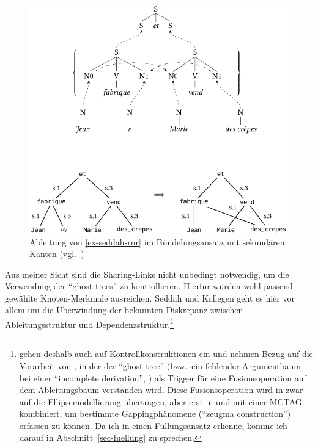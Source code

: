 \begin{figure}[t]
\centering
\includegraphics{graphics/abb813.pdf}
\caption{\label{fig-seddah-rnr-2}Ableitung von \ref{ex-seddah-rnr} im Bündelungsansatz mit sekundären Kanten (vgl.\ \citealt[Abbildung~2]{Seddah:etal:10})}
\end{figure}
   
\largerpage
Aus meiner Sicht sind die Sharing-Links nicht unbedingt notwendig, um die Verwendung der "`ghost trees"' zu kontrollieren. Hierfür würden wohl passend gewählte Knoten-Merkmale ausreichen. Seddah und Kollegen geht es hier vor allem um die Überwindung der bekannten Diskrepanz zwischen Ableitungsstruktur und Dependenzstruktur.\footnote{\cite{Seddah:etal:10} gehen deshalb auch auf Kontrollkonstruktionen ein und nehmen Bezug auf die Vorarbeit von \cite{Seddah:Gaiffe:05}, in der der "`ghost tree"' (bzw.\ ein fehlender Argumentbaum bei einer "`incomplete derivation"', \citealt[292]{Seddah:Gaiffe:05}) als Trigger für eine Fusionsoperation auf dem Ableitungsbaum verstanden wird. Diese Fusionsoperation wird in \cite{Seddah:Sagot:06} zwar auf die Ellipsemodellierung übertragen, aber erst in \cite{Seddah:08} und \cite{Seddah:etal:10} mit einer MCTAG kombiniert, um bestimmte Gappingphänomene ("`zeugma construction"') erfassen zu können. Da ich in \cite{Seddah:Sagot:06} einen Füllungsansatz erkenne, komme ich darauf in Abschnitt~\ref{sec-fuellung} zu sprechen.} 


